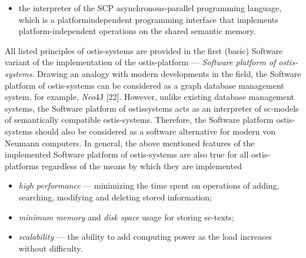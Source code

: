 \documentclass{article}
\begin{document}
\begin{multicols}{2}
\begin{itemize}
\end{itemize}
\begin{itemize}
\item the interpreter of the SCP asynchronous-parallel
programming language, which is a platformindependent programming interface that implements
platform-independent operations on the shared semantic memory.
\end{itemize}
\par
{All listed principles of ostis-systems are provided in
the first (basic) Software variant of the implementation of
the ostis-platform — \textit{Software platform of ostis-systems}.
Drawing an analogy with modern developments in the
field, the Software platform of ostis-systems can be
considered as a graph database management system, for
example, \textit{Neo}4J [22]. However, unlike existing database
management systems, the Software platform of ostissystems acts as an interpreter of sc-models of semantically compatible ostis-systems. Therefore, the Software
platform ostis-systems should also be considered as a
software alternative for modern von Neumann computers.
In general, the above mentioned features of the implemented Software platform of ostis-systems are also true
for all ostis-platforms regardless of the means by which
they are implemented}\par
{}
\begin{itemize}
\item \textit{high performance} — minimizing the time spent
on operations of adding, searching, modifying and
deleting stored information;
\item \textit{minimum memory} and  \textit{disk space} usage for storing sc-texts;
\item \textit{scalability} — the ability to add computing power as
the load increases without difficulty.

\end{itemize}
\par
\begin{center}
    


\end{center}
\end{multicols}
\end{document}
